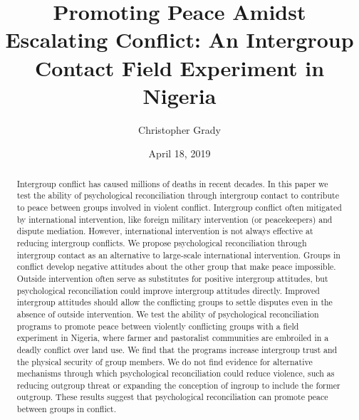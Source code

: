 \documentclass[11pt]{article}
\title{Promoting Peace Amidst Escalating Conflict: An Intergroup Contact Field
Experiment in Nigeria}
\author{
Christopher Grady
}
\date{April 18, 2019}
\begin{document}
\VerbatimFootnotes

%
%
%
%
%
%
%
%
%
%

\maketitle

\begin{abstract}

Intergroup conflict has caused millions of deaths in recent decades.  In this paper we test the ability of psychological reconciliation through intergroup contact to contribute to peace between groups involved in violent conflict.  Intergroup conflict often mitigated by international intervention, like foreign military intervention (or peacekeepers) and dispute mediation.  However, international intervention is not always effective at reducing intergroup conflicts.  We propose psychological reconciliation through intergroup contact as an alternative to large-scale international intervention.  Groups in conflict develop negative attitudes about the other group that make peace impossible.  Outside intervention often serve as substitutes for positive intergroup attitudes, but psychological reconciliation could improve intergroup attitudes directly.  Improved intergroup attitudes should allow the conflicting groups to settle disputes even in the absence of outside intervention.  We test the ability of psychological reconciliation programs to promote peace between violently conflicting groups with a field experiment in Nigeria, where farmer and pastoralist communities are embroiled in a deadly conflict over land use.  We find that the programs increase intergroup trust and the physical security of group members.  We do not find evidence for alternative mechanisms through which psychological reconciliation could reduce violence, such as reducing outgroup threat or expanding the conception of ingroup to include the former outgroup.  These results suggest that psychological reconciliation can promote peace between groups in conflict.

\end{abstract}
\end{document}
